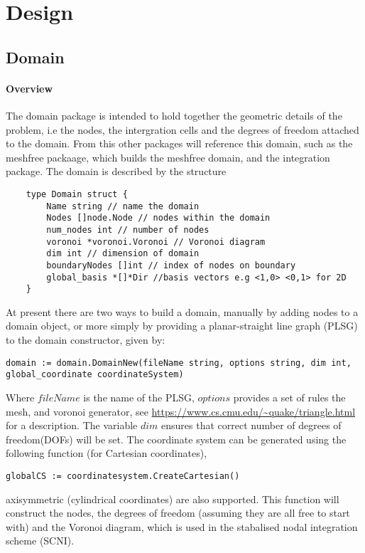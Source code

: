 \chapter{Design}
\section{Domain}

\subsubsection*{Overview}
The domain package is intended to hold together the geometric details of the problem, i.e the nodes, the intergration cells and the degrees of freedom attached to the domain. From this other packages will reference this domain, such as the meshfree packaage, which builds the meshfree domain, and the integration package.
The domain is described by the structure 

\begin{tcolorbox}
	\begin{lstlisting}
	type Domain struct {	
		Name string // name the domain
		Nodes []node.Node // nodes within the domain
		num_nodes int // number of nodes
		voronoi *voronoi.Voronoi // Voronoi diagram
		dim int // dimension of domain
		boundaryNodes []int // index of nodes on boundary
		global_basis *[]*Dir //basis vectors e.g <1,0> <0,1> for 2D 
	}
	\end{lstlisting}
\end{tcolorbox}

At present there are two ways to build a domain, manually by adding nodes to a domain object, or more simply by providing a planar-straight line graph (PLSG) to the domain constructor, given by:
\begin{tcolorbox}
\begin{lstlisting}
domain := domain.DomainNew(fileName string, options string, dim int, global_coordinate coordinateSystem)
\end{lstlisting}
\end{tcolorbox}

Where $fileName$ is the name of the PLSG, $options$ provides a set of rules the mesh, and voronoi generator, see \url{https://www.cs.cmu.edu/~quake/triangle.html} for a description. The variable $dim$ ensures that correct number of degrees of freedom(DOFs) will be set. The coordinate system can be generated using the following function (for Cartesian coordinates),
\begin{lstlisting}
globalCS := coordinatesystem.CreateCartesian()
\end{lstlisting}
axisymmetric (cylindrical coordinates) are also supported. This function will construct the nodes, the degrees of freedom (assuming they are all free to start with) and the Voronoi diagram, which is used in the stabalised nodal integration scheme (SCNI).

